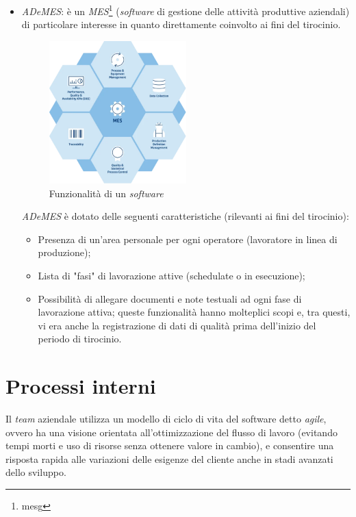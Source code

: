 \begin{itemize}
    \item \textit{ADeMES}: è un \textit{MES}\footnote{\gls{mesg}} (\textit{software} di gestione delle attività produttive aziendali) di particolare interesse in quanto direttamente coinvolto ai fini del tirocinio.
    \begin{figure}[H]
        \centering
        \includegraphics[width=0.5\textwidth]{images/mes.png}
        \caption[Funzionalità di un \textit{software MES}]{Funzionalità di un \textit{software } \footnotemark}
    \end{figure}

    \textit{ADeMES} è dotato delle seguenti caratteristiche (rilevanti ai fini del tirocinio):
    \begin{itemize}
        \item Presenza di un'area personale per ogni operatore (lavoratore in linea di produzione);
        \item Lista di "fasi" di lavorazione attive (schedulate o in esecuzione);
        \item Possibilità di allegare documenti e note testuali ad ogni fase di lavorazione attiva; queste funzionalità hanno molteplici scopi e, tra questi, vi era anche la registrazione di dati di qualità prima dell'inizio del periodo di tirocinio.
    \end{itemize}
\end{itemize}

\section{Processi interni}

Il \textit{team} aziendale utilizza un modello di ciclo di vita del software detto \textit{agile}, ovvero ha una visione orientata all'ottimizzazione del flusso di lavoro (evitando tempi morti e uso di risorse senza ottenere valore in cambio), 
e consentire una risposta rapida alle variazioni delle esigenze del cliente anche in stadi avanzati dello sviluppo.

